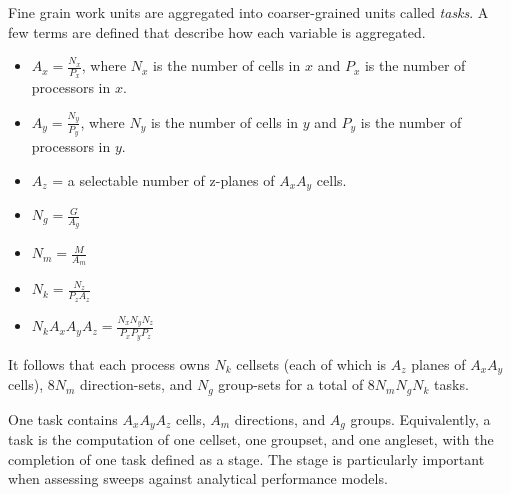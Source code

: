 \documentclass[11pt, letterpaper,titlepage,oneside]{article}
\begin{document}
Fine grain work units are aggregated into coarser-grained units called \textit{tasks}. A few terms are defined that describe how each variable is aggregated.
\begin{itemize}
\item $A_x = \frac{N_x}{P_x}$, where $N_x$ is the number of cells in $x$ and $P_x$ is the number of processors in $x$.
\item $A_y = \frac{N_y}{P_y}$, where $N_y$ is the number of cells in $y$ and $P_y$ is the number of processors in $y$.
\item $A_z$ = a selectable number of z-planes of $A_x A_y$ cells.
\item $N_g = \frac{G}{A_g}$
\item $N_m = \frac{M}{A_m}$
\item $N_k = \frac{N_z}{P_z A_z}$
\item $N_k A_x A_y A_z = \frac{N_x N_y N_z}{P_x P_y P_z}$
\end{itemize}

It follows that each process owns $N_k$ cellsets (each of which is $A_z$ planes of $A_x A_y$ cells), $8N_m$ direction-sets, and $N_g$ group-sets for a total of $8N_m N_g N_k$ tasks.

One task contains $A_x A_y A_z$ cells, $A_m$ directions, and $A_g$ groups. Equivalently, a task is the computation of one cellset, one groupset, and one angleset, with the completion of one task defined as a stage.  The stage is particularly important when assessing sweeps against analytical performance models. 
\end{document}
